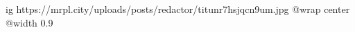  
 
 
 
 

\ifcmt
  ig https://mrpl.city/uploads/posts/redactor/titunr7hsjqcn9um.jpg
  @wrap center
  @width 0.9
\fi
